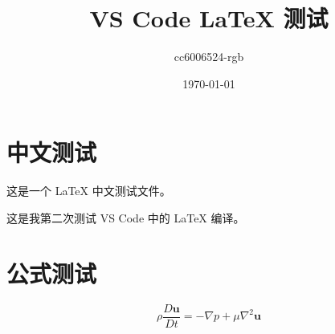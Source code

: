 \documentclass[UTF8]{ctexart}
\title{VS Code LaTeX 测试}
\author{cc6006524-rgb}
\date{\today}
\begin{document}
\maketitle

\section{中文测试}

这是一个 LaTeX 中文测试文件。

这是我第二次测试 VS Code 中的 LaTeX 编译。

\section{公式测试}

\[
\rho \frac{D\mathbf{u}}{Dt}
=
-\nabla p + \mu \nabla^2 \mathbf{u}
\]
\end{document}
